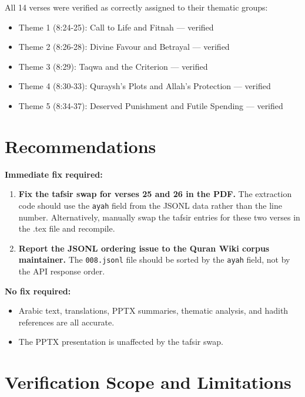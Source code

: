 \documentclass[11pt,a4paper]{article}
\begin{document}
All 14 verses were verified as correctly assigned to their thematic groups:
\begin{itemize}
\item Theme 1 (8:24-25): Call to Life and Fitnah --- verified
\item Theme 2 (8:26-28): Divine Favour and Betrayal --- verified
\item Theme 3 (8:29): Taqwa and the Criterion --- verified
\item Theme 4 (8:30-33): Quraysh's Plots and Allah's Protection --- verified
\item Theme 5 (8:34-37): Deserved Punishment and Futile Spending --- verified
\end{itemize}

\section*{Recommendations}

\begin{infobox}
\textbf{Immediate fix required:}
\begin{enumerate}
\item \textbf{Fix the tafsir swap for verses 25 and 26 in the PDF.} The extraction code should use the \texttt{ayah} field from the JSONL data rather than the line number. Alternatively, manually swap the tafsir entries for these two verses in the .tex file and recompile.
\item \textbf{Report the JSONL ordering issue to the Quran Wiki corpus maintainer.} The \texttt{008.jsonl} file should be sorted by the \texttt{ayah} field, not by the API response order.
\end{enumerate}

\textbf{No fix required:}
\begin{itemize}
\item Arabic text, translations, PPTX summaries, thematic analysis, and hadith references are all accurate.
\item The PPTX presentation is unaffected by the tafsir swap.
\end{itemize}
\end{infobox}

\section*{Verification Scope and Limitations}
\end{document}
